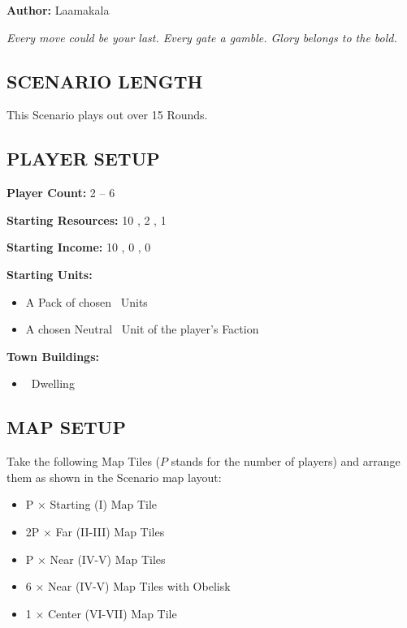 
\begin{multicols*}{2}

\textbf{Author:} Laamakala

\textit{Every move could be your last. Every gate a gamble. Glory belongs to the bold.}

\subsection*{\MakeUppercase{Scenario Length}}
This Scenario plays out over 15 Rounds.

\subsection*{\MakeUppercase{Player Setup}}
\textbf{Player Count:} 2 -- 6

\textbf{Starting Resources:} 10 , 2 , 1 

\textbf{Starting Income:} 10 , 0 , 0 

\textbf{Starting Units:}

\begin{itemize}
  \item A Pack of chosen \bronze\ Units
  \item A chosen Neutral \bronze\ Unit of the player's Faction
\end{itemize}

\textbf{Town Buildings:}
\begin{itemize}
  \item \bronze\ Dwelling
\end{itemize}

\subsection*{\MakeUppercase{Map Setup}}
Take the following Map Tiles ($P$ stands for the number of players) and arrange them as shown in the Scenario map layout:

\begin{itemize}
  \item P × Starting (I) Map Tile
  \item 2P × Far (II-III) Map Tiles
  \item P × Near (IV-V) Map Tiles
  \item 6 × Near (IV-V) Map Tiles with Obelisk
  \item 1 × Center (VI-VII) Map Tile
\end{itemize}


\end{multicols*}
